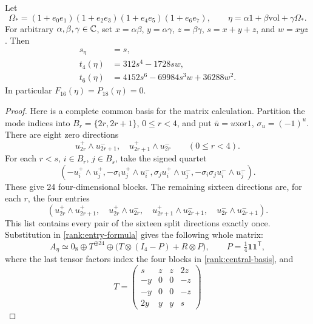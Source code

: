 \begin{lemma}\label{rank:normal-certificate}
Let
\[
 \Omega_*=(1+e_0e_1)(1+e_2e_3)(1+e_4e_5)(1+e_6e_7),
 \qquad \eta=\alpha1+\beta\mathrm{vol}+\gamma\Omega_*.
\]
For arbitrary $\alpha,\beta,\gamma\in\mathbb C$, set
$x=\alpha\beta$, $y=\alpha\gamma$, $z=\beta\gamma$,
$s=x+y+z$, and $w=xyz$. Then
\begin{align}
 s_\eta&=s,\label{rank:normal-halfpair}\\
 t_4(\eta)&=312s^4-1728sw,\label{rank:normal-t4}\\
 t_6(\eta)&=4152s^6-69984s^3w+36288w^2.
 \label{rank:normal-t6}
\end{align}
In particular $F_{16}(\eta)=P_{18}(\eta)=0$.
\end{lemma}
\begin{proof}
Here is a complete common basis for the matrix calculation. Partition the
mode indices into $B_r=\{2r,2r+1\}$, $0\le r<4$, and put
$\bar u=u\mathbin{\mathrm{xor}}1$, $\sigma_u=(-1)^u$.
There are eight zero directions
\[
 u_{2r}^+\wedge u_{2r+1}^-,\quad
 u_{2r+1}^+\wedge u_{2r}^-\qquad(0\le r<4).
\]
For each $r<s$, $i\in B_r$, $j\in B_s$, take the signed quartet
\begin{equation}
 \left(-u_i^+\wedge u_j^+,
 -\sigma_i u_j^+\wedge u_{\bar i}^-,
 \sigma_j u_i^+\wedge u_{\bar j}^-,
 -\sigma_i\sigma_j u_{\bar i}^-\wedge u_{\bar j}^-\right).
 \label{rank:quartet}
\end{equation}
These give 24 four-dimensional blocks. The remaining sixteen directions
are, for each $r$, the four entries
\begin{equation}
 \left(u_{2r}^+\wedge u_{2r+1}^+,\quad
 u_{2r}^+\wedge u_{2r}^-,\quad
 u_{2r+1}^+\wedge u_{2r+1}^-,\quad
 u_{2r}^-\wedge u_{2r+1}^-\right).
 \label{rank:central-basis}
\end{equation}
This list contains every pair of the sixteen split directions exactly once.
Substitution in \eqref{rank:entry-formula} gives the following whole matrix:
\begin{equation}
 A_\eta\simeq0_8\oplus T^{\oplus24}\oplus
       \bigl(T\otimes(I_4-P)+R\otimes P\bigr),\qquad
 P=\tfrac14\mathbf1\mathbf1^{\mathsf T},
 \label{rank:normal-blocks}
\end{equation}
where the last tensor factors index the four blocks in
\eqref{rank:central-basis}, and
\begin{equation}
 T=\begin{pmatrix}
 s&z&z&2z\\-y&0&0&-z\\-y&0&0&-z\\2y&y&y&s

\end{pmatrix}
\end{equation}
\end{proof}
